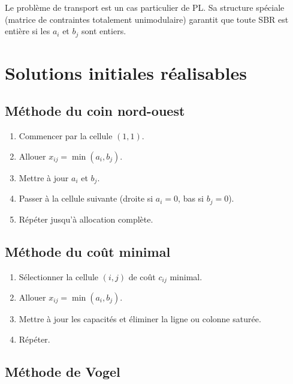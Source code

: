\begin{remarque}
Le probl\`eme de transport est un cas particulier de PL.  Sa structure
sp\'eciale (matrice de contraintes totalement unimodulaire) garantit que
toute SBR est enti\`ere si les $a_i$ et $b_j$ sont entiers.
\end{remarque}

\section{Solutions initiales r\'ealisables}

\subsection{M\'ethode du coin nord-ouest}

\begin{algorithme}[title=\textbf{Coin nord-ouest}]
\begin{enumerate}
  \item Commencer par la cellule $(1,1)$.
  \item Allouer $x_{ij} = \min(a_i, b_j)$.
  \item Mettre \`a jour $a_i$ et $b_j$.
  \item Passer \`a la cellule suivante (droite si $a_i = 0$, bas si $b_j = 0$).
  \item R\'ep\'eter jusqu'\`a allocation compl\`ete.
\end{enumerate}
\end{algorithme}

\subsection{M\'ethode du co\^ut minimal}

\begin{algorithme}[title=\textbf{Co\^ut minimal}]
\begin{enumerate}
  \item S\'electionner la cellule $(i,j)$ de co\^ut $c_{ij}$ minimal.
  \item Allouer $x_{ij} = \min(a_i, b_j)$.
  \item Mettre \`a jour les capacit\'es et \'eliminer la ligne ou colonne satur\'ee.
  \item R\'ep\'eter.
\end{enumerate}
\end{algorithme}

\subsection{M\'ethode de Vogel}


